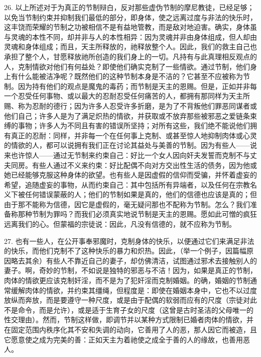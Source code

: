 26. 以上所述对于为真正的节制辩白，反对那些虚伪节制的摩尼教徒，已经足够；以免当节制约束并抑制我们最低的部分，即身体，使之远离过度与非法的快乐时，这丰饶而荣耀的节制之功被相信不是有益地管教，而是敌对地迫害。确实，身体虽与灵魂的本性不同，却并非与人的本性相异：因为灵魂并非由身体组成，但人却由灵魂和身体组成；而且，天主所释放的，祂释放整个人。因此，我们的救主自己也承担了整个人，甘愿释放祂所创造的我们身上的一切。凡持有与此真理相反观点的人，克制情欲对他们有何益处？即使他们确实克制了一些情欲。通过节制，他们身上有什么能被洁净呢？既然他们的这种节制本身是不洁的？它甚至不应被称为节制。因为持有他们的观点是魔鬼的毒药；而节制是天主的恩赐。但是，正如并非每一个忍受任何事物、或以最大的忍耐忍受任何痛苦的人，都拥有那同样为天主所赐、称为忍耐的德行；因为许多人忍受许多折磨，是为了不背叛他们罪恶同谋者或他们自己；许多人是为了满足炽热的情欲，并获取或不放弃那些被邪恶之爱链条束缚的事物；许多人为不同且有害的错误所坚持；对所有这些，我们绝不能说他们拥有真正的忍耐：同样，并非每一个在任何事上克制、或甚至惊人地抑制肉体或心灵的情欲的人，都可以说拥有我们正在讨论其益处与美善的节制。因为有些人——说来也许惊人——通过无节制来约束自己：好比一个女人因向奸夫发誓而克制不与丈夫同房。有些人通过不义来约束：好比配偶不向对方交出性生活的债务，因为他或她已经能够克服这种身体的欲望。也有些人是因虚假的信仰而受骗，并怀着虚妄的希望，追随虚妄的事物，从而约束自己：其中包括所有异端者，以及任何在宗教名义下被任何错误蒙蔽的人；他们的节制如果是真的，他们的信德也应该是真的；但由于那不能称为信德，因它是虚假的，毫无疑问那也不配称为节制。怎么？我们准备称那种节制为罪吗？而我们必须真实地说节制是天主的恩赐。愿如此可憎的疯狂远离我们的心。但蒙福的宗徒说：因此，凡没有信德的，就不应称为节制。\par

27. 也有一些人，在公开事奉邪魔时，克制身体的快乐，以便通过它们来满足非法的快乐，而他们克制不了这种快乐的暴力和炽热。因此，（举一个例子，因篇幅原因略去其余）有些人不靠近自己的妻子，却仿佛清洁，试图通过邪术去接触别人的妻子。啊，奇妙的节制，不如说是独特的邪恶与不洁！因为，如果是真正的节制，肉体的情欲更应该克制奸淫，而不是为了犯奸淫而克制婚姻。的确，婚姻的节制通常缓解肉体的情欲，并约束其缰绳，但程度是：即使在婚姻本身中，它也不以过度放纵而奔放，而是要遵守一种尺度，或是由于配偶的软弱而应有的尺度（宗徒对此不是命令，而是允许），或是适于生育子女的尺度（这曾是古时圣洁的父母唯一的性交理由）。然而，节制这样做，即调节并以某种方式限制已婚者肉体的情欲，并在固定范围内秩序化其不安和失调的动向，它善用了人的恶，那人因它而被造，且它愿意使之成为完美的善：正如天主为着祂使之成全于善的人的缘故，也善用恶人。\par

